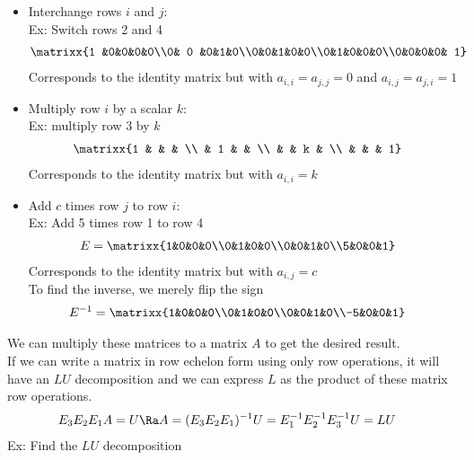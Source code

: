 \begin{itemize}
    \item Interchange rows $i$ and $j$:\\
    Ex: Switch rows 2 and 4
    \begin{align*}
        &\matrixx{1 &0&0&0&0\\0& 0 &0&1&0\\0&0&1&0&0\\0&1&0&0&0\\0&0&0&0& 1}
    \end{align*}
    Corresponds to the identity matrix but with $a_{i,i}=a_{j,j}=0$ and $a_{i,j}=a_{j,i}=1$
    \item Multiply row $i$ by a scalar $k$:\\
    Ex: multiply row 3 by $k$
    \begin{align*}
       &\matrixx{1 & & & \\ & 1 & & \\ & & k & \\ & & & 1}
    \end{align*}
    Corresponds to the identity matrix but with $a_{i,i}=k$
    \item Add $c$ times row $j$ to row $i$:\\
    Ex: Add 5 times row 1 to row 4
    \begin{align*}
        &E=\matrixx{1&0&0&0\\0&1&0&0\\0&0&1&0\\5&0&0&1}
    \end{align*}
    Corresponds to the identity matrix but with $a_{i,j}=c$\\
    To find the inverse, we merely flip the sign
    \begin{align*}
        &E^{-1}=\matrixx{1&0&0&0\\0&1&0&0\\0&0&1&0\\-5&0&0&1}
    \end{align*}
\end{itemize}
We can multiply these matrices to a matrix $A$ to get the desired result.\\
If we can write a matrix in row echelon form using only row operations, it will have an $LU$ decomposition and we can express $L$ as the product of these matrix row operations.
\begin{align*}
    &E_3E_2E_1A=U\Ra A=(E_3E_2E_1)^{-1}U=E_1^{-1}E_2^{-1}E_3^{-1}U=LU
\end{align*}
Ex: Find the $LU$ decomposition
